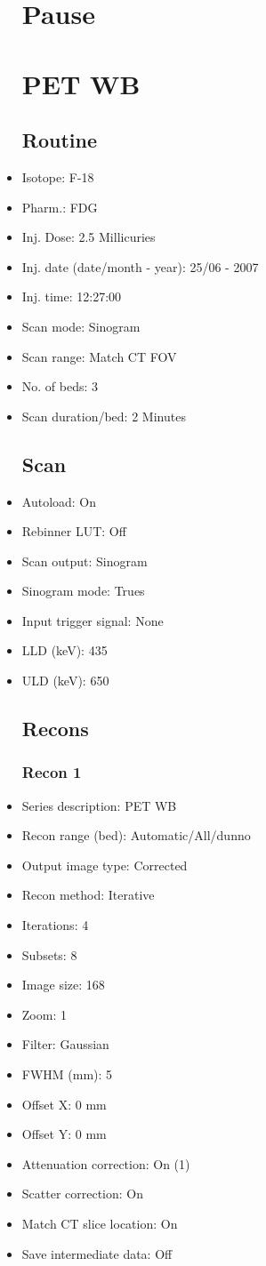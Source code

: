 \documentclass[12pt]{article}
\begin{document}
\begin{itemize}
\section{Pause}
\section{PET WB}\subsection{Routine}
\item Isotope: F-18
\item Pharm.: FDG
\item Inj. Dose: 2.5 Millicuries
\item Inj. date (date/month - year): 25/06 - 2007
\item Inj. time: 12:27:00
\item Scan mode: Sinogram
\item Scan range: Match CT FOV
\item No. of beds: 3
\item Scan duration/bed: 2 Minutes
\subsection{Scan}
\item Autoload: On
\item Rebinner LUT: Off
\item Scan output: Sinogram
\item Sinogram mode: Trues
\item Input trigger signal: None
\item LLD (keV): 435
\item ULD (keV): 650
\subsection{Recons}
\subsubsection{Recon 1}
\item Series description: PET WB 
\item Recon range (bed): Automatic/All/dunno
\item Output image type: Corrected
\item Recon method: Iterative
\item Iterations: 4
\item Subsets: 8
\item Image size: 168
\item Zoom: 1
\item Filter: Gaussian
\item FWHM (mm): 5
\item Offset X: 0 mm
\item Offset Y: 0 mm
\item Attenuation correction: On (1)
\item Scatter correction: On
\item Match CT slice location: On
\item Save intermediate data: Off

\end{itemize}
\end{document}
